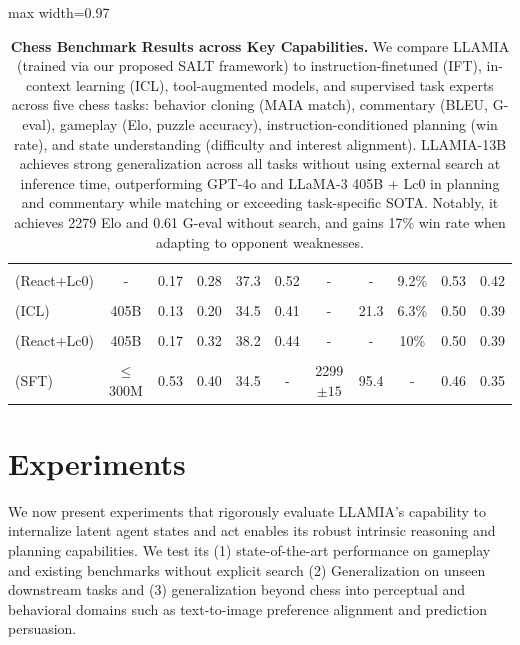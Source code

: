 \documentclass{article}
\newcommand{\valbest}[1]{\colorbox{valbest}{#1}}
\newcommand{\valgood}[1]{\colorbox{valgood}{#1}}
\theoremstyle{plain}
\theoremstyle{definition}
\theoremstyle{remark}
\begin{document}
\begin{table}[h]
\begin{adjustbox}{max width=0.97\textwidth}
\begin{tabular}{lc|cc|cc|cc|c|cc}
    \midrule
    \makecell[l]{\textbf{GPT-4o}\\\small{(React+Lc0)}} & - & 0.17 & 0.28 & 37.3 & \valgood{0.52} & - & - & 9.2\% & 0.53 & 0.42 \\
    \midrule
    \makecell[l]{\textbf{LLaMA-3}\\\small{(ICL)}} & 405B & 0.13 & 0.20 & 34.5 & 0.41 & - & 21.3 & 6.3\% & 0.50 & 0.39 \\
    \midrule
    \makecell[l]{\textbf{LLaMA-3}\\\small{(React+Lc0)}} & 405B & 0.17 & 0.32 & \valgood{38.2} & 0.44 & - & - & \valgood{10\%} & 0.50 & 0.39 \\
    \midrule
    \makecell[l]{\textbf{SOTA}\\\small{(SFT)}} & $\leq$300M & \valgood{0.53} & 0.40 & 34.5 & - & \valbest{2299\small{$\pm15$}} & \valbest{95.4} & - & 0.46 & 0.35 \\
    \bottomrule[1.2pt]
    \end{tabular}
    \end{adjustbox}
    \vspace{2mm}
    \caption{\textbf{Chess Benchmark Results across Key Capabilities.} 
We compare LLAMIA (trained via our proposed SALT framework) to instruction-finetuned (IFT), in-context learning (ICL), tool-augmented models, and supervised task experts across five chess tasks: behavior cloning (MAIA match), commentary (BLEU, G-eval), gameplay (Elo, puzzle accuracy), instruction-conditioned planning (win rate), and state understanding (difficulty and interest alignment). LLAMIA-13B achieves strong generalization across all tasks without using external search at inference time, outperforming GPT-4o and LLaMA-3 405B + Lc0 in planning and commentary while matching or exceeding task-specific SOTA. Notably, it achieves 2279 Elo and 0.61 G-eval without search, and gains 17\% win rate when adapting to opponent weaknesses.
\vspace{-3mm}
}
    \label{tab:chess_benchmarks}
\end{table}
\section{Experiments}
\label{sec:experiments}
We now present experiments that rigorously evaluate LLAMIA’s capability to internalize latent agent states and act enables its robust intrinsic reasoning and planning capabilities. We test its (1) state-of-the-art performance on gameplay and existing benchmarks without explicit search (2) Generalization on unseen downstream tasks and (3) generalization beyond chess into perceptual and behavioral domains such as text-to-image preference alignment and prediction persuasion.
\end{document}
